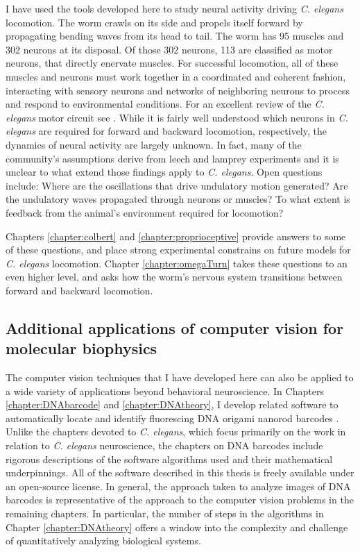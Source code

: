 I have used the tools developed here to study neural activity driving \emph{C. elegans} locomotion. The worm crawls on its side and propels itself forward by propagating bending waves from its head to tail.  The worm has 95 muscles and 302 neurons at its disposal. Of those 302 neurons, 113 are classified as motor neurons, that  directly enervate muscles. For successful locomotion, all of these muscles and neurons must work together in a coordinated and coherent fashion, interacting with sensory neurons and  networks of neighboring neurons to process and respond to environmental conditions. For an excellent review of the \textit{C. elegans}  motor circuit see \citep{von_stetina_motor_2006}. While it is fairly well understood which neurons  in \textit{C. elegans} are required for forward and backward locomotion, respectively, the dynamics of neural activity are largely unknown. In fact, many of the community's assumptions derive from leech and lamprey experiments \citep{friesen_sensory_2001, karbowski_systems_2008} and it is unclear to what extend those findings apply to \textit{C. elegans}. Open questions include: Where are the oscillations that drive undulatory motion generated? Are the undulatory waves propagated through neurons or muscles? To what extent is  feedback from the animal's environment required for locomotion? 

%


Chapters \ref{chapter:colbert} and \ref{chapter:proprioceptive} provide answers to some of these questions, and place strong experimental constrains on future models for \textit{C. elegans} locomotion.  Chapter \ref{chapter:omegaTurn} takes these questions to an even higher level, and asks how the worm's nervous system transitions between forward and backward locomotion. 



\subsection{Additional applications of computer vision for molecular biophysics}
The computer vision techniques that I have developed here can also be applied to a wide variety of applications beyond behavioral neuroscience. In Chapters \ref{chapter:DNAbarcode} and \ref{chapter:DNAtheory}, I develop related software to automatically locate and identify fluorescing DNA origami nanorod barcodes . Unlike the chapters devoted to \textit{C. elegans}, which focus primarily on the work in relation to \textit{C. elegans} neuroscience, the chapters on DNA barcodes include rigorous descriptions of the software algorithms used and  their mathematical underpinnings. All of the software described in this thesis is freely available under an open-source license.   In general, the approach taken to analyze images of DNA barcodes is representative of the approach to the computer vision problems in the remaining chapters. In particular, the number of steps in the algorithms in Chapter \ref{chapter:DNAtheory} offers a window into the complexity and challenge of quantitatively analyzing biological systems. 


